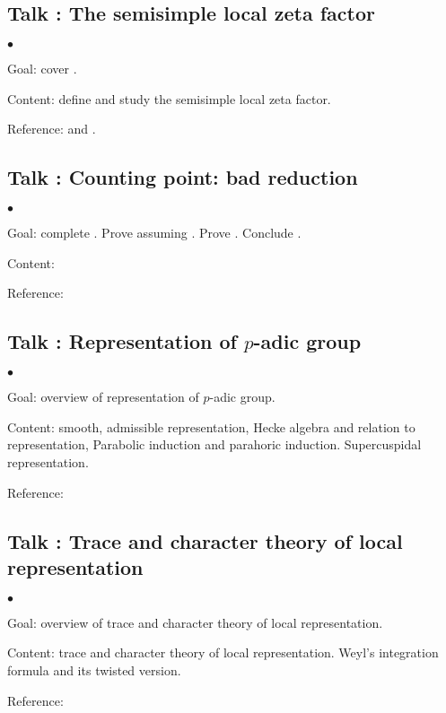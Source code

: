 \documentclass[a4paper, reqno]{amsart} %
\theoremstyle{definition}
\numberwithin{equation}{section}
\newenvironment{altitemize}
	{\begin{list}
			{$\bullet$}
			{\setlength{\labelwidth}{0pt}
				\setlength{\itemindent}{5pt}
				\setlength{\labelsep}{5pt}
				\setlength{\leftmargin}{0pt}
				\setlength{\itemsep}{\the\smallskipamount}
		}}
		{\end{list}}
\begin{document}
\subsection{Talk : The semisimple local zeta factor}
\begin{altitemize}
\item[Goal:] cover \cite[\S 7]{Scholze-MC}.
\item[Content:] define and study the semisimple local zeta factor.
\item[Reference:] \cite[\S 3]{Haines-Ngo} and \cite{Rapoport-simisimpletrace}.
\end{altitemize}


\subsection{Talk : Counting point: bad reduction}
\begin{altitemize}
\item[Goal:] complete \cite[\S 8]{Scholze-MC}. Prove \cite[Corollary 9.6]{Scholze-MC} assuming \cite[Theorem 9.3]{Scholze-MC}. Prove \cite[Corollary 9.8]{Scholze-MC}. Conclude \cite[Corollary 10.1]{Scholze-MC}.
\item[Content:] 
\item[Reference:] 
\end{altitemize}


\subsection{Talk : Representation of $p$-adic group}
\begin{altitemize}
\item[Goal:] overview of representation of $p$-adic group.
\item[Content:] smooth, admissible representation, Hecke algebra and relation to representation, Parabolic induction and parahoric induction. Supercuspidal representation.
\item[Reference:] 
\end{altitemize}


\subsection{Talk : Trace and character theory of local representation}
\begin{altitemize}
\item[Goal:] overview of trace and character theory of local representation.
\item[Content:] trace and character theory of local representation. Weyl’s integration formula and its twisted version.
\item[Reference:] 
\end{altitemize}
\end{document}
